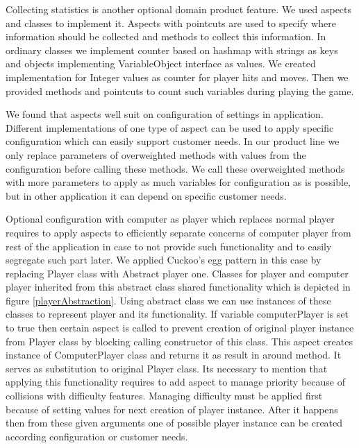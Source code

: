 \documentclass[11pt,english,a4paper,twoside]{article}
\begin{document}
Collecting statistics is another optional domain product feature. We used aspects and classes to implement it. Aspects with pointcuts are used to specify where information should be collected and methods to collect this information. In ordinary classes we implement counter based on hashmap with strings as keys and objects implementing VariableObject interface as values. We created implementation for Integer values as counter for player hits and moves. Then we provided methods and pointcuts to count such variables during playing the game. 

We found that aspects well suit on configuration of settings in application. Different implementations of one type of aspect can be used to apply specific configuration which can easily support customer needs. In our product line we only replace parameters of overweighted methods with values from the configuration before calling these methods. We call these overweighted methods with more parameters to apply as much variables for configuration as is possible, but in other application it can depend on specific customer needs. 

Optional configuration with computer as player which replaces normal player requires to apply aspects to efficiently separate concerns of computer player from rest of the application in case to not provide such functionality and to easily segregate such part later. We applied Cuckoo's egg pattern in this case by replacing Player class with Abstract player one. Classes for player and computer player inherited from this abstract class shared functionality which is depicted in figure \ref{playerAbstraction}. Using abstract class we can use instances of these classes to represent player and its functionality. If variable computerPlayer is set to true then certain aspect is called to prevent creation of original player instance from Player class by blocking calling constructor of this class. This aspect creates instance of ComputerPlayer class and returns it as result in around method. It serves as substitution to original Player class. Its necessary to mention that applying this functionality requires to add aspect to manage priority because of collisions with difficulty features. Managing difficulty must be applied first because of setting values for next creation of player instance. After it happens then from these given arguments one of possible player instance can be created according configuration or customer needs.   
\end{document}
